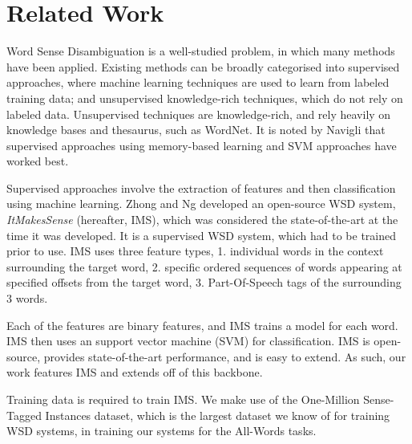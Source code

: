 \section{Related Work}

Word Sense Disambiguation is a well-studied problem, in which many
methods have been applied. Existing methods can be broadly categorised
into supervised approaches, where machine learning techniques are used
to learn from labeled training data; and unsupervised knowledge-rich
techniques, which do not rely on labeled data. Unsupervised techniques
are knowledge-rich, and rely heavily on knowledge bases and thesaurus,
such as WordNet. It is noted by Navigli 
that supervised approaches using memory-based learning and SVM
approaches have worked best.

Supervised approaches involve the extraction of features and then
classification using machine learning. Zhong and Ng
 developed an open-source WSD system, {\it
  ItMakesSense} (hereafter, IMS), which was considered the
state-of-the-art at the time it was developed.  It is a supervised WSD
system, which had to be trained prior to use. IMS uses three feature
types, 1. individual words in the context surrounding the target word,
2. specific ordered sequences of words appearing at specified offsets
from the target word, 3. Part-Of-Speech tags of the surrounding 3
words.

Each of the features are binary features, and IMS trains a model for
each word. IMS then uses an support vector machine (SVM) for
classification. IMS is open-source, provides state-of-the-art
performance, and is easy to extend. As such, our work features IMS and
extends off of this backbone.

Training data is required to train IMS.  We make use of the
One-Million Sense-Tagged Instances \cite{taghipour2015one} dataset,
which is the largest dataset we know of for training WSD systems, in
training our systems for the All-Words tasks.

